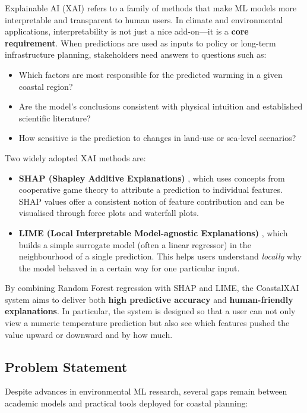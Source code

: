 \documentclass[12pt, a4paper]{article}
\begin{document}
Explainable AI (XAI) refers to a family of methods that make ML models
more interpretable and transparent to human users. In climate and
environmental applications, interpretability is not just a nice
add-on—it is a \textbf{core requirement}. When predictions are used as
inputs to policy or long-term infrastructure planning, stakeholders need
answers to questions such as:
\begin{itemize}
  \item Which factors are most responsible for the predicted warming in a
  given coastal region?
  \item Are the model's conclusions consistent with physical intuition and
  established scientific literature?
  \item How sensitive is the prediction to changes in land-use or sea-level
  scenarios?
\end{itemize}

Two widely adopted XAI methods are:
\begin{itemize}
  \item \textbf{SHAP (Shapley Additive Explanations)} \cite{shap2017}, which
  uses concepts from cooperative game theory to attribute a
  prediction to individual features. SHAP values offer a consistent
  notion of feature contribution and can be visualised through
  force plots and waterfall plots.
  \item \textbf{LIME (Local Interpretable Model-agnostic Explanations)}
  \cite{lime2016}, which builds a simple surrogate model (often a
  linear regressor) in the neighbourhood of a single prediction. This
  helps users understand \textit{locally} why the model behaved in a certain
  way for one particular input.
\end{itemize}

By combining Random Forest regression with SHAP and LIME, the
CoastalXAI system aims to deliver both \textbf{high predictive accuracy}
and \textbf{human-friendly explanations}. In particular, the system is designed
so that a user can not only view a numeric temperature prediction but
also see which features pushed the value upward or downward and by
how much.

\subsection{\textbf{Problem Statement}}

Despite advances in environmental ML research, several gaps remain
between academic models and practical tools deployed for coastal
planning:
\end{document}
